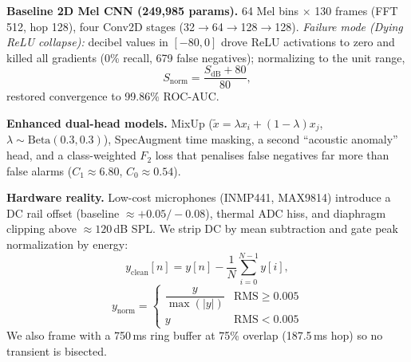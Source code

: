 \documentclass[conference]{IEEEtran}
\begin{document}
\textbf{Baseline 2D Mel CNN (249{,}985 params).} 64 Mel bins $\times$ 130 frames (FFT 512, hop 128), four
Conv2D stages (32$\to$64$\to$128$\to$128). \textit{Failure mode (Dying ReLU collapse):} decibel values in
$[-80,0]$ drove ReLU activations to zero and killed all gradients (0\% recall, 679 false negatives);
normalizing to the unit range,
\begin{equation}
    S_{\text{norm}} = \frac{S_{\text{dB}} + 80}{80},
\end{equation}
restored convergence to 99.86\% ROC-AUC.

\textbf{Enhanced dual-head models.} MixUp
($\tilde{x} = \lambda x_i + (1-\lambda)x_j$, $\lambda \sim \text{Beta}(0.3,0.3)$), SpecAugment time masking,
a second ``acoustic anomaly'' head, and a class-weighted $F_2$ loss that penalises false negatives far more
than false alarms ($C_1 \approx 6.80$, $C_0 \approx 0.54$).

\textbf{Hardware reality.} Low-cost microphones (INMP441, MAX9814) introduce a DC rail offset (baseline
$\approx +0.05/-0.08$), thermal ADC hiss, and diaphragm clipping above $\approx 120$\,dB SPL. We strip DC by
mean subtraction and gate peak normalization by energy:
\begin{equation}
    y_{\text{clean}}[n] = y[n] - \frac{1}{N}\sum_{i=0}^{N-1} y[i],
\end{equation}
\begin{equation}
    y_{\text{norm}} = \begin{cases}
        \dfrac{y}{\max(|y|)} & \text{RMS} \ge 0.005 \\[6pt]
        y & \text{RMS} < 0.005
    \end{cases}
\end{equation}
We also frame with a 750\,ms ring buffer at 75\% overlap (187.5\,ms hop) so no transient is bisected.
\end{document}
